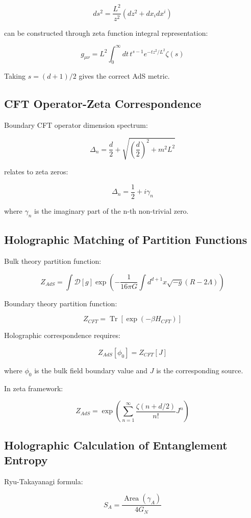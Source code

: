 \documentclass[12pt,a4paper]{article}
\DeclareMathOperator{\Tr}{Tr}
\DeclareMathOperator{\Area}{Area}
\begin{document}
$$ds^2 = \frac{L^2}{z^2}(dz^2 + dx_i dx^i)$$

can be constructed through zeta function integral representation:

$$g_{\mu\nu} = L^2 \int_0^\infty dt \, t^{s-1} e^{-tz^2/L^2} \zeta(s)$$

Taking $s = (d+1)/2$ gives the correct AdS metric.

\subsection{CFT Operator-Zeta Correspondence}

Boundary CFT operator dimension spectrum:

$$\Delta_n = \frac{d}{2} + \sqrt{\left(\frac{d}{2}\right)^2 + m^2 L^2}$$

relates to zeta zeros:

$$\Delta_n = \frac{1}{2} + i\gamma_n$$

where $\gamma_n$ is the imaginary part of the n-th non-trivial zero.

\subsection{Holographic Matching of Partition Functions}

Bulk theory partition function:

$$Z_{AdS} = \int \mathcal{D}[g] \exp\left(-\frac{1}{16\pi G} \int d^{d+1}x \sqrt{-g}(R - 2\Lambda)\right)$$

Boundary theory partition function:

$$Z_{CFT} = \Tr\left[\exp\left(-\beta H_{CFT}\right)\right]$$

Holographic correspondence requires:

$$Z_{AdS}[\phi_0] = Z_{CFT}[J]$$

where $\phi_0$ is the bulk field boundary value and $J$ is the corresponding source.

In zeta framework:

$$Z_{AdS} = \exp\left(\sum_{n=1}^{\infty} \frac{\zeta(n+d/2)}{n!} J^n\right)$$

\subsection{Holographic Calculation of Entanglement Entropy}

Ryu-Takayanagi formula:

$$S_A = \frac{\Area(\gamma_A)}{4G_N}$$
\end{document}
